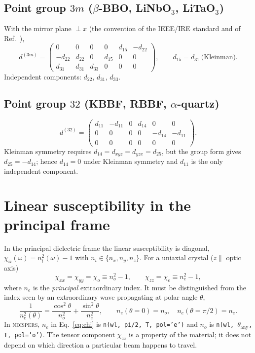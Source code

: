 \documentclass[aps,pra,preprint,amsmath,amssymb,nofootinbib,superscriptaddress]{revtex4-2}
\newcommand{\ndispers}{\textsc{ndispers}}
\begin{document}
\subsection{Point group $3m$ (\texorpdfstring{$\beta$}{beta}-BBO, LiNbO$_3$, LiTaO$_3$)}

With the mirror plane $\perp x$ (the convention of the IEEE/IRE
standard and of Ref.~\cite{Dmitriev}),
\begin{equation}
  d^{(3m)} =
  \begin{pmatrix}
    0 & 0 & 0 & 0 & d_{15} & -d_{22}\\
    -d_{22} & d_{22} & 0 & d_{15} & 0 & 0\\
    d_{31} & d_{31} & d_{33} & 0 & 0 & 0
  \end{pmatrix},
  \qquad d_{15}=d_{31}\ \text{(Kleinman)}.
  \label{eq:d3m}
\end{equation}
Independent components: $d_{22}$, $d_{31}$, $d_{33}$.

\subsection{Point group $32$ (KBBF, RBBF, \texorpdfstring{$\alpha$}{alpha}-quartz)}

\begin{equation}
  d^{(32)} =
  \begin{pmatrix}
    d_{11} & -d_{11} & 0 & d_{14} & 0 & 0\\
    0 & 0 & 0 & 0 & -d_{14} & -d_{11}\\
    0 & 0 & 0 & 0 & 0 & 0
  \end{pmatrix}.
  \label{eq:d32}
\end{equation}
Kleinman symmetry requires $d_{14}=d_{xyz}=d_{yzx}=d_{25}$, but the
group form gives $d_{25}=-d_{14}$; hence $d_{14}=0$ under Kleinman
symmetry and $d_{11}$ is the only independent component.

\section{Linear susceptibility in the principal frame}
\label{sec:chi}

In the principal dielectric frame the linear susceptibility is diagonal,
$\chi_{ii}(\omega)=n_i^2(\omega)-1$ with $n_i\in\{n_x,n_y,n_z\}$. For a
uniaxial crystal ($z\parallel$ optic axis)
\begin{equation}
  \chi_{xx}=\chi_{yy}=\chi_o \equiv n_o^2-1,\qquad
  \chi_{zz}=\chi_e \equiv n_e^2-1,
  \label{eq:chi}
\end{equation}
where $n_e$ is the \emph{principal} extraordinary index. It must be
distinguished from the index seen by an extraordinary wave propagating at
polar angle $\theta$,
\begin{equation}
  \frac{1}{n_e^2(\theta)} = \frac{\cos^2\theta}{n_o^2}+\frac{\sin^2\theta}{n_e^2},
  \qquad n_e(\theta{=}0)=n_o,\quad n_e(\theta{=}\pi/2)=n_e.
  \label{eq:ne_theta}
\end{equation}
In \ndispers, $n_e$ in Eq.~\eqref{eq:chi} is \texttt{n(wl, pi/2, T, pol='e')}
and $n_o$ is \texttt{n(wl, $\theta_{\mathrm{any}}$, T, pol='o')}.
The tensor component $\chi_{zz}$ is a property of the material; it does
not depend on which direction a particular beam happens to travel.
\end{document}

